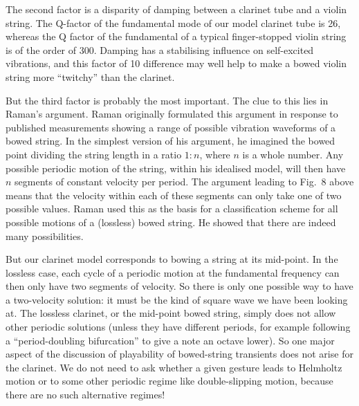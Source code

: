  The second factor is a disparity of damping between a clarinet tube and a 
  violin string. The Q-factor of the fundamental mode of our model clarinet 
  tube is 26, whereas the Q factor of the fundamental of a typical 
  finger-stopped violin string is of the order of 300. Damping has a 
  stabilising influence on self-excited vibrations, and this factor of 10 
  difference may well help to make a bowed violin string more “twitchy” than 
  the clarinet. 

  But the third factor is probably the most important. The clue to this lies in 
  Raman’s argument. Raman originally formulated this argument in response to 
  published measurements showing a range of possible vibration waveforms of a 
  bowed string. In the simplest version of his argument, he imagined the bowed 
  point dividing the string length in a ratio $1:n$, where $n$ is a whole 
  number. Any possible periodic motion of the string, within his idealised 
  model, will then have $n$ segments of constant velocity per period. The 
  argument leading to Fig.\ 8 above means that the velocity within each of 
  these segments can only take one of two possible values. Raman used this as 
  the basis for a classification scheme for all possible motions of a 
  (lossless) bowed string. He showed that there are indeed many possibilities. 

  But our clarinet model corresponds to bowing a string at its mid-point. In 
  the lossless case, each cycle of a periodic motion at the fundamental 
  frequency can then only have two segments of velocity. So there is only one 
  possible way to have a two-velocity solution: it must be the kind of square 
  wave we have been looking at. The lossless clarinet, or the mid-point bowed 
  string, simply does not allow other periodic solutions (unless they have 
  different periods, for example following a “period-doubling bifurcation” to 
  give a note an octave lower). So one major aspect of the discussion of 
  playability of bowed-string transients does not arise for the clarinet. We do 
  not need to ask whether a given gesture leads to Helmholtz motion or to some 
  other periodic regime like double-slipping motion, because there are no such 
  alternative regimes! 


